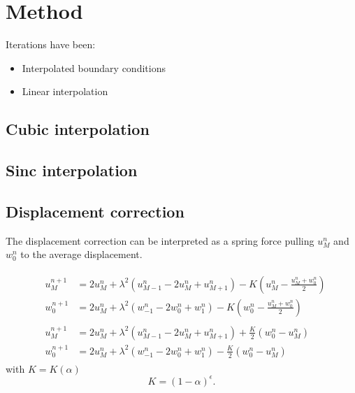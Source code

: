 \section{Method}
Iterations have been:
\begin{itemize}
    \item Interpolated boundary conditions
    \item Linear interpolation
\end{itemize}

\subsection{Cubic interpolation}

\subsection{Sinc interpolation}


\subsection{Displacement correction}

The displacement correction can be interpreted as a spring force pulling $u_M^n$ and $w_0^n$ to the average displacement.

\begin{align}
    &\begin{aligned}
        u_{M}^{n+1} &= 2u_M^n + \lambda^2 (u_{M-1} ^n- 2u_M^n  + u_{M+1}^n) - K \left(u_M^n - \frac{u_M^n + w_0^n}{2}\right)\\
        w_0^{n+1} &= 2u_M^n + \lambda^2 (w_{-1} ^n- 2w_0^n  + w_1^n) - K \left(w_0^n - \frac{u_M^n + w_0^n}{2}\right) 
    \end{aligned}\\
    &\begin{aligned}
        u_{M}^{n+1} &= 2u_M^n + \lambda^2 (u_{M-1} ^n- 2u_M^n  + u_{M+1}^n) + \frac{K}{2} (w_0^n - u_M^n)\\
        w_0^{n+1} &= 2u_M^n + \lambda^2 (w_{-1} ^n- 2w_0^n  + w_1^n) - \frac{K}{2} (w_0^n - u_M^n) 
    \end{aligned}
\end{align}
with $K = K(\alpha)$
\begin{equation}
    K = (1-\alpha)^\epsilon.
\end{equation}